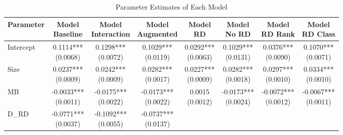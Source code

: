 \documentclass[12pt, times]{article}
\begin{document}
\begin{table}[h!]
    \centering
    \caption{Parameter Estimates of Each Model}
    \label{table:2}
    \begin{tabular}{lccccccc}
        \toprule
        Parameter & \makecell{Model \\ Baseline} & \makecell{Model \\ Interaction} & \makecell{Model \\ Augmented} & \makecell{Model \\ RD} & \makecell{Model \\ No RD} & \makecell{Model \\ RD Rank} & \makecell{Model \\ RD Class} \\
        \midrule
        Intercept & \makecell{0.1114*** \\ (0.0068)} & \makecell{0.1298*** \\ (0.0072)} & \makecell{0.1029*** \\ (0.0119)} & \makecell{0.0292*** \\ (0.0063)} & \makecell{0.1029*** \\ (0.0131)} & \makecell{0.0376*** \\ (0.0090)} & \makecell{0.1070*** \\ (0.0071)} \\
        Size & \makecell{0.0237*** \\ (0.0009)} & \makecell{0.0242*** \\ (0.0009)} & \makecell{0.0282*** \\ (0.0017)} & \makecell{0.0227*** \\ (0.0009)} & \makecell{0.0282*** \\ (0.0018)} & \makecell{0.0297*** \\ (0.0010)} & \makecell{0.0334*** \\ (0.0010)} \\
        MB & \makecell{-0.0033*** \\ (0.0011)} & \makecell{-0.0175*** \\ (0.0022)} & \makecell{-0.0173*** \\ (0.0022)} & \makecell{0.0015 \\ (0.0012)} & \makecell{-0.0173*** \\ (0.0024)} & \makecell{-0.0072*** \\ (0.0012)} & \makecell{-0.0067*** \\ (0.0011)} \\
        D\_RD & \makecell{-0.0771*** \\ (0.0037)} & \makecell{-0.1092*** \\ (0.0055)} & \makecell{-0.0737*** \\ (0.0137)} & & & \\

\end{tabular}
\end{table}
\end{document}
